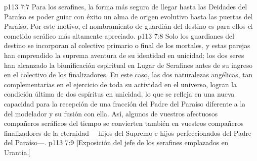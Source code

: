 \vs p113 7:7 \pc Para los serafines, la forma más segura de llegar hasta las Deidades del Paraíso es poder guiar con éxito un alma de origen evolutivo hasta las puertas del Paraíso. Por este motivo, el nombramiento de guardián del destino es para ellos el cometido seráfico más altamente apreciado.
\vs p113 7:8 Solo los guardianes del destino se incorporan al colectivo primario o final de los mortales, y estas parejas han emprendido la suprema aventura de su identidad en unicidad; los dos seres han alcanzado la biunificación espiritual en Lugar de Serafines antes de su ingreso en el colectivo de los finalizadores. En este caso, las dos naturalezas angélicas, tan complementarias en el ejercicio de toda su actividad en el universo, logran la condición última de dos espíritus en unicidad, lo que se refleja en una nueva capacidad para la recepción de una fracción del Padre del Paraíso diferente a la del modelador y su fusión con ella. Así, algunos de vuestros afectuosos compañeros seráficos del tiempo se convierten también en vuestros compañeros finalizadores de la eternidad ---hijos del Supremo e hijos perfeccionados del Padre del Paraíso---.
\vsetoff
\vs p113 7:9 [Exposición del jefe de los serafines emplazados en Urantia.]
